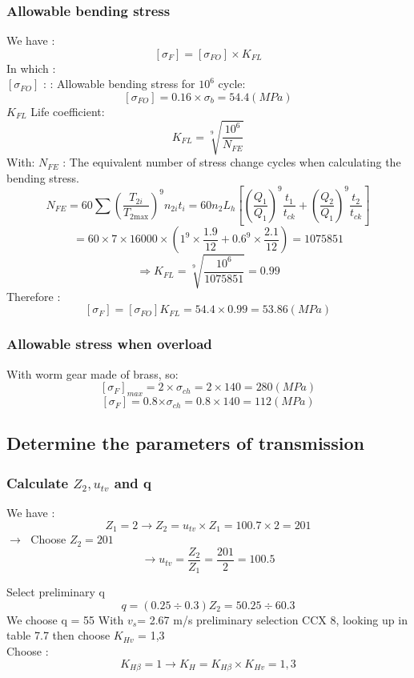 \subsubsection{Allowable bending stress }
We have :
$$[\sigma_F] = [\sigma_{FO}]\times K_{FL}$$
In which :\\
$[\sigma_{FO}]$ : : Allowable bending stress for $10^6$ cycle:
$$	[\sigma_{FO}] =  0.16 \times\sigma_b= 54.4 (MPa)$$
$K_{FL}$ Life coefficient:
$$K_{FL}= \sqrt[9]{\frac{10^6}{N_{FE}}}$$
With:
$N_{FE}$ : The equivalent number of stress change cycles when calculating the bending stress.
 $$
N_{FE}=60 \sum\left(\frac{T_{2 i}}{T_{2 \mathrm{max}}}\right)^{9} n_{2 i} t_{i}=60 n_{2} L_{h}\left[\left(\frac{Q_{1}}{Q_{1}}\right)^{9} \frac{t_{1}}{t_{c k}}+\left(\frac{Q_{2}}{Q_{1}}\right)^{9} \frac{t_{2}}{t_{c k}}\right]
$$
$$	=60\times7\times16000\times\left(1^9\times\frac{1.9}{12}+{0.6}^9\times\frac{2.1}{12}\right)= 1075851 $$
$$ ⇒ K_{FL}=\sqrt[9]{\frac{{10}^6}{1075851}}=0.99$$
Therefore :
$$	[\sigma_{F}]= \left[\sigma_{FO}\right]K_{FL}=54.4\times0.99=53.86 (MPa) $$

\subsubsection{Allowable stress when overload }
With worm gear made of  brass, so: \\
	$$\left[\sigma_F\right]_{max}=2\times\sigma_{ch}=2\times140=280 (MPa)$$
	$$	\left[\sigma_F\right]=0.8{\times\sigma}_{ch}=0.8\times140=112 (MPa)$$

\subsection{Determine the parameters of transmission}
\subsubsection{Calculate $Z_2, u_{tv}$ and q}
We have :
	$$Z_1 = 2\rightarrow Z_2=u_{tv}\times Z_1=100.7\times2=201 $$
	$\rightarrow \;$ Choose $Z_2 = 201$
$$\rightarrow u_{tv}=\frac{Z_2}{Z_1}=\frac{201}{2}=100.5$$

Select preliminary q
$$q=\left(0.25\div0.3\right)Z_2=50.25\div60.3 $$
We choose q = 55
With $v_s$= 2.67 m/s preliminary selection CCX 8, looking up in table 7.7 then choose $K_{Hv}$ = 1,3\\
Choose : $$K_{H\beta}=1\rightarrow K_H=K_{H\beta}\times K_{Hv}=1,3$$



